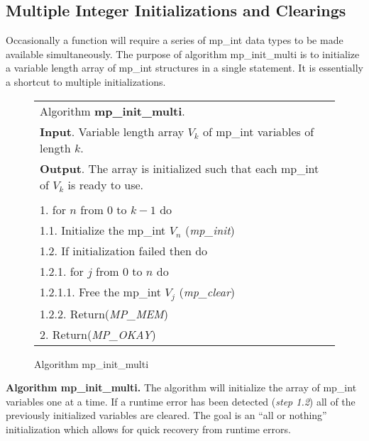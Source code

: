 \documentclass[b5paper]{book}
\begin{document}
\subsection{Multiple Integer Initializations and Clearings}
Occasionally a function will require a series of mp\_int data types to be made available simultaneously.  
The purpose of algorithm mp\_init\_multi is to initialize a variable length array of mp\_int structures in a single
statement.  It is essentially a shortcut to multiple initializations.

\newpage\begin{figure}[here]
\begin{center}
\begin{tabular}{l}
\hline Algorithm \textbf{mp\_init\_multi}. \\
\textbf{Input}.   Variable length array $V_k$ of mp\_int variables of length $k$. \\
\textbf{Output}.  The array is initialized such that each mp\_int of $V_k$ is ready to use. \\
\hline \\
1.  for $n$ from 0 to $k - 1$ do \\
\hspace{+3mm}1.1.  Initialize the mp\_int $V_n$ (\textit{mp\_init}) \\
\hspace{+3mm}1.2.  If initialization failed then do \\
\hspace{+6mm}1.2.1.  for $j$ from $0$ to $n$ do \\
\hspace{+9mm}1.2.1.1.  Free the mp\_int $V_j$ (\textit{mp\_clear}) \\
\hspace{+6mm}1.2.2.   Return(\textit{MP\_MEM}) \\
2.  Return(\textit{MP\_OKAY}) \\
\hline
\end{tabular}
\end{center}
\caption{Algorithm mp\_init\_multi}
\end{figure}

\textbf{Algorithm mp\_init\_multi.}
The algorithm will initialize the array of mp\_int variables one at a time.  If a runtime error has been detected 
(\textit{step 1.2}) all of the previously initialized variables are cleared.  The goal is an ``all or nothing'' 
initialization which allows for quick recovery from runtime errors.
\end{document}
